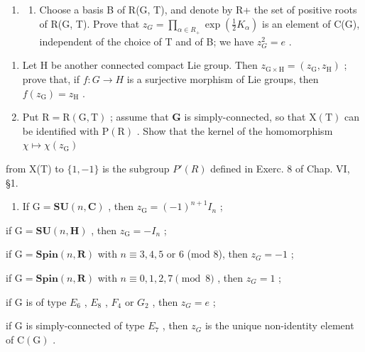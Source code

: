 \begin{enumerate}
\def\labelenumi{\arabic{enumi})}
\setcounter{enumi}{12}
\tightlist
\item
  \begin{enumerate}
  \def\labelenumii{\alph{enumii})}
  \tightlist
  \item
    Choose a basis B of R(G, T), and denote by R+ the set of positive roots of R(G, T). Prove that \(z_{G} = \prod_{\alpha \in R_{+}} \exp(\frac{1}{2} K_{\alpha})\) is an element of C(G), independent of the choice of T and of B; we have \(z_{G}^{2} = e\) .
  \end{enumerate}
\end{enumerate}

\begin{enumerate}
\def\labelenumi{\alph{enumi})}
\setcounter{enumi}{1}
\item
  Let H be another connected compact Lie group. Then \(z_{\mathrm{G}\times\mathrm{H}} = (z_{\mathrm{G}}, z_{\mathrm{H}})\) ; prove that, if \(f : G \to H\) is a surjective morphism of Lie groups, then \(f(z_{\mathrm{G}}) = z_{\mathrm{H}}\) .
\item
  Put \(\mathrm{R} = \mathrm{R}(\mathrm{G},\mathrm{T})\) ; assume that \(\mathbf{G}\) is simply-connected, so that \(\mathrm{X(T)}\) can be identified with \(\mathrm{P(R)}\) . Show that the kernel of the homomorphism \(\chi \mapsto \chi (z_{\mathrm{G}})\)
\end{enumerate}

from X(T) to \(\{1,-1\}\) is the subgroup \(P'(R)\) defined in Exerc. 8 of Chap. VI, §1.

\begin{enumerate}
\def\labelenumi{\alph{enumi})}
\setcounter{enumi}{3}
\tightlist
\item
  If \(\mathrm{G} = \mathbf{S}\mathbf{U}(n,\mathbf{C})\) , then \(z_{\mathrm{G}} = (-1)^{n + 1}I_n\) ;
\end{enumerate}

if \(\mathrm{G} = \mathbf{S}\mathbf{U}(n,\mathbf{H})\) , then \(z_{\mathrm{G}} = -I_n\) ;

if \(\mathrm{G} = \mathbf{Spin}(n, \mathbf{R})\) with \(n \equiv 3, 4, 5\) or 6 (mod 8), then \(z_{G} = -1\) ;

if \(\mathrm{G} = \mathbf{Spin}(n, \mathbf{R})\) with \(n \equiv 0, 1, 2, 7 \pmod{8}\) , then \(z_{G} = 1\) ;

if G is of type \(E_{6}\) , \(E_{8}\) , \(F_{4}\) or \(G_{2}\) , then \(z_{G} = e\) ;

if G is simply-connected of type \(E_{7}\) , then \(z_{G}\) is the unique non-identity element of \(\mathrm{C}(\mathrm{G})\) .

